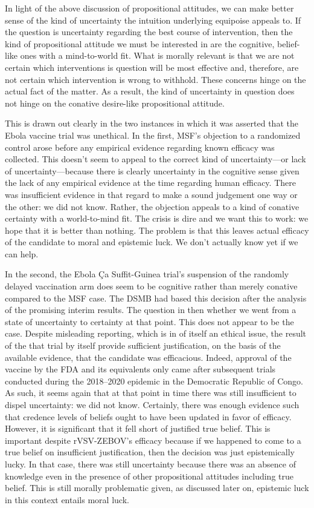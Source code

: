 \documentclass[letterpaper,notitlepage,12pt]{article}
\begin{document}
In light of the above discussion of propositional attitudes, we can make better
sense of the kind of uncertainty the intuition underlying equipoise appeals to.
If the question is uncertainty regarding the best course of intervention, then
the kind of propositional attitude we must be interested in are the cognitive,
belief-like ones with a mind-to-world fit.
What is morally relevant is that we are not certain which interventions is
question will be most effective and, therefore, are not certain which
intervention is wrong to withhold.
These concerns hinge on the actual fact of the matter.
As a result, the kind of uncertainty in question does not hinge on the conative
desire-like propositional attitude.

This is drawn out clearly in the two instances in which it was asserted that
the Ebola vaccine trial was unethical.
In the first, MSF's objection to a randomized control arose before any empirical
evidence regarding known efficacy was collected.
This doesn't seem to appeal to the correct kind of uncertainty---or lack of
uncertainty---because there is clearly uncertainty in the cognitive sense given
the lack of any empirical evidence at the time regarding human efficacy.
There was insufficient evidence in that regard to make a sound judgement one way
or the other: we did not know.
Rather, the objection appeals to a kind of conative certainty with a
world-to-mind fit.
The crisis is dire and we want this to work: we hope that it is better than
nothing.
The problem is that this leaves actual efficacy of the candidate to moral and
epistemic luck.
We don't actually know yet if we can help.

In the second, the Ebola \c{C}a Suffit-Guinea trial's suspension of the randomly
delayed vaccination arm does seem to be cognitive rather than merely conative
compared to the MSF case.
The DSMB had based this decision after the analysis of the promising interim
results.
The question in then whether we went from a state of uncertainty to certainty at
that point.
This does not appear to be the case.
Despite misleading reporting, which is in of itself an ethical issue, the result
of the that trial by itself provide sufficient justification, on the basis of
the available evidence, that the candidate was efficacious.
Indeed, approval of the vaccine by the FDA and its equivalents only came after
subsequent trials conducted during the 2018--2020 epidemic in the Democratic
Republic of Congo.
As such, it seems again that at that point in time there was still insufficient
to dispel uncertainty: we did not know.
Certainly, there was enough evidence such that credence levels of beliefs ought
to have been updated in favor of efficacy.
However, it is significant that it fell short of justified true belief.
This is important despite rVSV-ZEBOV's efficacy because if we happened to come
to a true belief on insufficient justification, then the decision was just
epistemically lucky.
In that case, there was still uncertainty because there was an absence of
knowledge even in the presence of other propositional attitudes including
true belief.
This is still morally problematic given, as discussed later on, epistemic luck 
in this context entails moral luck.
\end{document}

